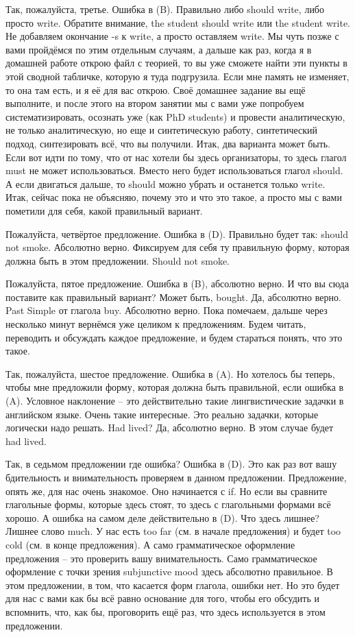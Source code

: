 \documentclass[main.tex]{subfiles}
\begin{document}
Так, пожалуйста, третье.
Ошибка в (B).
Правильно либо should write, либо просто write.
Обратите внимание, the student should write или the student write.
Не добавляем окончание -s к write, а просто оставляем write.
Мы чуть позже с вами пройдёмся по этим отдельным случаям, а дальше как раз, когда я в домашней работе открою файл с теорией, то вы уже сможете найти эти пункты в этой сводной табличке, которую я туда подгрузила.
Если мне память не изменяет, то она там есть, и я её для вас открою.
Своё домашнее задание вы ещё выполните, и после этого на втором занятии мы с вами уже попробуем систематизировать, осознать уже (как PhD students) и провести аналитическую, не только аналитическую, но еще и синтетическую работу, синтетический подход, синтезировать всё, что вы получили.
Итак, два варианта может быть.
Если вот идти по тому, что от нас хотели бы здесь организаторы, то здесь глагол must не может использоваться.
Вместо него будет использоваться глагол should.
А если двигаться дальше, то should можно убрать и останется только write.
Итак, сейчас пока не объясняю, почему это и что это такое, а просто мы с вами пометили для себя, какой правильный вариант.

Пожалуйста, четвёртое предложение.
Ошибка в (D).
Правильно будет так: should not smoke.
Абсолютно верно.
Фиксируем для себя ту правильную форму, которая должна быть в этом предложении.
Should not smoke.

Пожалуйста, пятое предложение.
Ошибка в (B), абсолютно верно.
И что вы сюда поставите как правильный вариант?
Может быть, bought.
Да, абсолютно верно.
Past Simple от глагола buy.
Абсолютно верно.
Пока помечаем, дальше через несколько минут вернёмся уже целиком к предложениям.
Будем читать, переводить и обсуждать каждое предложение, и будем стараться понять, что это такое.

Так, пожалуйста, шестое предложение.
Ошибка в (A).
Но хотелось бы теперь, чтобы мне предложили форму, которая должна быть правильной, если ошибка в (A).
Условное наклонение -- это действительно такие лингвистические задачки в английском языке.
Очень такие интересные.
Это реально задачки, которые логически надо решать.
Had lived?
Да, абсолютно верно.
В этом случае будет had lived.

Так, в седьмом предложении где ошибка?
Ошибка в (D).
Это как раз вот вашу бдительность и внимательность проверяем в данном предложении.
Предложение, опять же, для нас очень знакомое.
Оно начинается с if.
Но если вы сравните глагольные формы, которые здесь стоят, то здесь с глагольными формами всё хорошо.
А ошибка на самом деле действительно в (D).
Что здесь лишнее?
Лишнее слово much.
У нас есть too far (см. в начале предложения) и будет too cold (см. в конце предложения).
А само грамматическое оформление предложения -- это проверить вашу внимательность.
Само грамматическое оформление с точки зрения subjunctive mood здесь абсолютно правильное.
В этом предложении, в том, что касается форм глагола, ошибки нет.
Но это будет для нас с вами как бы всё равно основание для того, чтобы его обсудить и вспомнить, что, как бы, проговорить ещё раз, что здесь используется в этом предложении.
\end{document}
